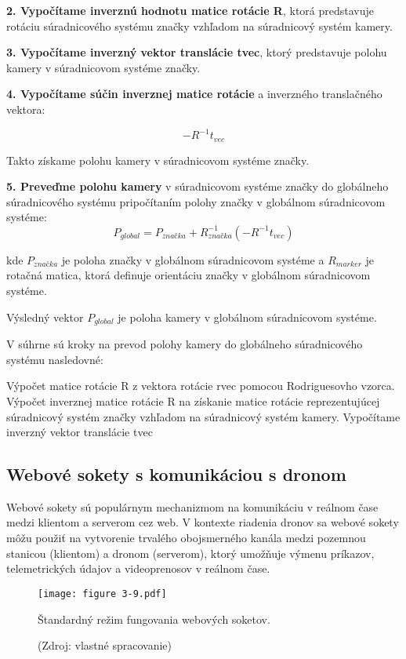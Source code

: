 {\textbf{2. Vypočítame inverznú hodnotu matice rotácie R}, ktorá predstavuje rotáciu súradnicového systému značky vzhľadom na súradnicový systém kamery.

\textbf{3. Vypočítame inverzný vektor translácie tvec}, ktorý predstavuje polohu kamery v súradnicovom systéme značky.

\textbf{4. Vypočítame súčin inverznej matice rotácie} a inverzného translačného vektora:

\begin{equation}
-R^{-1}t_{vec}
\end{equation}

Takto získame polohu kamery v súradnicovom systéme značky.

\textbf{5. Preveďme polohu kamery} v súradnicovom systéme značky do globálneho súradnicového systému pripočítaním polohy značky v globálnom súradnicovom systéme:
\begin{equation}
P_{global} = P_{značka} + R_{značka}^{-1}(-R^{-1}t_{vec})
\end{equation}

kde $P_{značka}$ je poloha značky v globálnom súradnicovom systéme a $R_{marker}$ je rotačná matica, ktorá definuje orientáciu značky v globálnom súradnicovom systéme.

Výsledný vektor $P_{global}$ je poloha kamery v globálnom súradnicovom systéme.

V súhrne sú kroky na prevod polohy kamery do globálneho súradnicového systému nasledovné:

Výpočet matice rotácie R z vektora rotácie rvec pomocou Rodriguesovho vzorca.
Výpočet inverznej matice rotácie R na získanie matice rotácie reprezentujúcej súradnicový systém značky vzhľadom na súradnicový systém kamery.
Vypočítame inverzný vektor translácie tvec


\subsection{Webové sokety s komunikáciou s dronom}
Webové sokety sú populárnym mechanizmom na komunikáciu v reálnom čase medzi klientom a serverom cez web. V kontexte riadenia dronov sa webové sokety môžu použiť na vytvorenie trvalého obojsmerného kanála medzi pozemnou stanicou (klientom) a dronom (serverom), ktorý umožňuje výmenu príkazov, telemetrických údajov a videoprenosov v reálnom čase.

\begin{figure}[ht!]
    \centering
    \texttt{[image: figure 3-9.pdf]}
    \caption{Štandardný režim fungovania webových soketov.}
    \captionsetup{font=footnotesize, justification=centering, skip=5pt}
    \caption*{(Zdroj: vlastné spracovanie)}
    \label{o:3-9}
\end{figure}  

}
